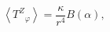 \begin{equation}
\left<T^{Z}{}_{\varphi}\right> 
= \frac{\kappa}{r^4} B(\alpha),
\label{t32}
\end{equation}

